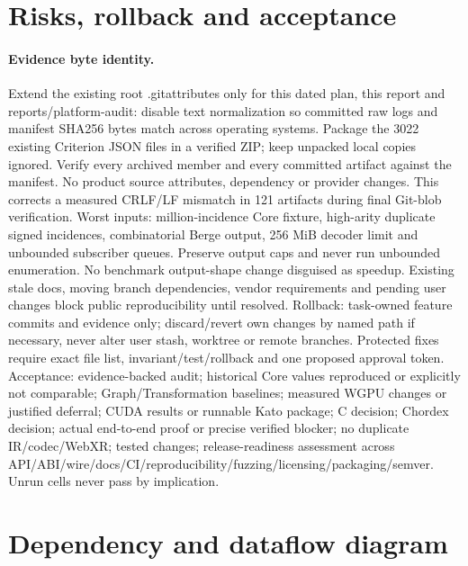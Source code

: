 \documentclass[10pt,a4paper]{article}
\begin{document}
\section{Risks, rollback and acceptance}
\paragraph{Evidence byte identity.}
Extend the existing root .gitattributes only for this dated plan, this report and
reports/platform-audit: disable text normalization so committed raw logs and
manifest SHA256 bytes match across operating systems. Package the 3022 existing
Criterion JSON files in a verified ZIP; keep unpacked local copies ignored.
Verify every archived member and every committed artifact against the manifest.
No product source attributes, dependency or provider changes. This corrects a
measured CRLF/LF mismatch in 121 artifacts during final Git-blob verification.
Worst inputs: million-incidence Core fixture, high-arity duplicate signed incidences, combinatorial Berge output, 256 MiB decoder limit and unbounded subscriber queues. Preserve output caps and never run unbounded enumeration. No benchmark output-shape change disguised as speedup. Existing stale docs, moving branch dependencies, vendor requirements and pending user changes block public reproducibility until resolved.
Rollback: task-owned feature commits and evidence only; discard/revert own changes by named path if necessary, never alter user stash, worktree or remote branches. Protected fixes require exact file list, invariant/test/rollback and one proposed approval token.
Acceptance: evidence-backed audit; historical Core values reproduced or explicitly not comparable; Graph/Transformation baselines; measured WGPU changes or justified deferral; CUDA results or runnable Kato package; C decision; Chordex decision; actual end-to-end proof or precise verified blocker; no duplicate IR/codec/WebXR; tested changes; release-readiness assessment across API/ABI/wire/docs/CI/reproducibility/fuzzing/licensing/packaging/semver. Unrun cells never pass by implication.
\section{Dependency and dataflow diagram}

\end{document}
